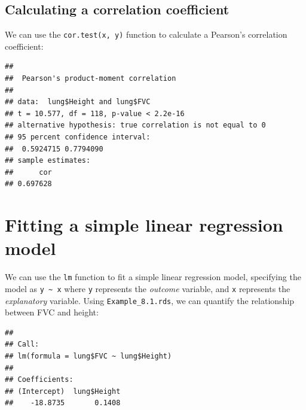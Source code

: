 \documentclass[
]{memoir}
\newenvironment{Shaded}{\begin{snugshade}}{\end{snugshade}}
\newcommand{\FunctionTok}[1]{\textcolor[rgb]{0.00,0.00,0.00}{#1}}
\newcommand{\NormalTok}[1]{#1}
\newcommand{\SpecialCharTok}[1]{\textcolor[rgb]{0.00,0.00,0.00}{#1}}
\begin{document}
\hypertarget{calculating-a-correlation-coefficient}{%
\subsection*{Calculating a correlation coefficient}\label{calculating-a-correlation-coefficient}}

We can use the \texttt{cor.test(x,\ y)} function to calculate a Pearson's correlation coefficient:

\begin{Shaded}
\end{Shaded}

\begin{verbatim}
## 
##  Pearson's product-moment correlation
## 
## data:  lung$Height and lung$FVC
## t = 10.577, df = 118, p-value < 2.2e-16
## alternative hypothesis: true correlation is not equal to 0
## 95 percent confidence interval:
##  0.5924715 0.7794090
## sample estimates:
##      cor 
## 0.697628
\end{verbatim}

\hypertarget{fitting-a-simple-linear-regression-model}{%
\section{Fitting a simple linear regression model}\label{fitting-a-simple-linear-regression-model}}

We can use the \texttt{lm} function to fit a simple linear regression model, specifying the model as \texttt{y\ \textasciitilde{}\ x} where \texttt{y} represents the \emph{outcome} variable, and \texttt{x} represents the \emph{explanatory} variable. Using \texttt{Example\_8.1.rds}, we can quantify the relationship between FVC and height:

\begin{Shaded}
\end{Shaded}

\begin{verbatim}
## 
## Call:
## lm(formula = lung$FVC ~ lung$Height)
## 
## Coefficients:
## (Intercept)  lung$Height  
##    -18.8735       0.1408
\end{verbatim}
\end{document}
